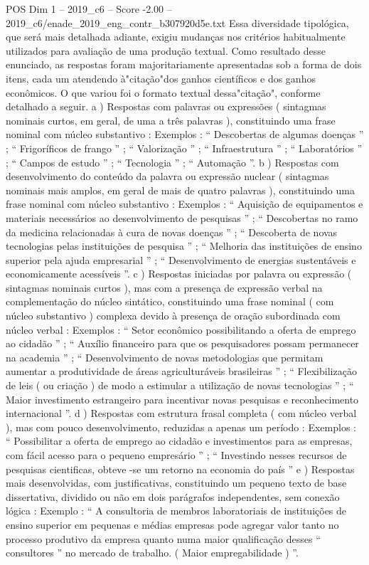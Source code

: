 \begin{textsample}{POS Dim 1 – 2019\_c6 – Score -2.00 – 2019\_c6/enade\_2019\_eng\_contr\_b307920d5e.txt}
Essa diversidade tipológica, que será mais detalhada adiante, exigiu mudanças nos critérios habitualmente utilizados para avaliação de uma produção textual.
Como resultado desse enunciado, as respostas foram majoritariamente apresentadas sob a forma de dois itens, cada um atendendo à"citação"dos ganhos científicos e dos ganhos econômicos.
O que variou foi o formato textual dessa"citação", conforme detalhado a seguir. a ) Respostas com palavras ou expressões ( sintagmas nominais curtos, em geral, de uma a três palavras ), constituindo uma frase nominal com núcleo substantivo : Exemplos : “ Descobertas de algumas doenças ” ; “ Frigoríficos de frango ” ; “ Valorização ” ; “ Infraestrutura ” ; “ Laboratórios ” ; “ Campos de estudo ” ; “ Tecnologia ” ; “ Automação ”. b ) Respostas com desenvolvimento do conteúdo da palavra ou expressão nuclear ( sintagmas nominais mais amplos, em geral de mais de quatro palavras ), constituindo uma frase nominal com núcleo substantivo : Exemplos : “ Aquisição de equipamentos e materiais necessários ao desenvolvimento de pesquisas ” ; “ Descobertas no ramo da medicina relacionadas à cura de novas doenças ” ; “ Descoberta de novas tecnologias pelas instituições de pesquisa ” ; “ Melhoria das instituições de ensino superior pela ajuda empresarial ” ; “ Desenvolvimento de energias sustentáveis e economicamente acessíveis ”. c ) Respostas iniciadas por palavra ou expressão ( sintagmas nominais curtos ), mas com a presença de expressão verbal na complementação do núcleo sintático, constituindo uma frase nominal ( com núcleo substantivo ) complexa devido à presença de oração subordinada com núcleo verbal : Exemplos : “ Setor econômico possibilitando a oferta de emprego ao cidadão ” ; “ Auxílio financeiro para que os pesquisadores possam permanecer na academia ” ; “ Desenvolvimento de novas metodologias que permitam aumentar a produtividade de áreas agriculturáveis brasileiras ” ; “ Flexibilização de leis ( ou criação ) de modo a estimular a utilização de novas tecnologias ” ; “ Maior investimento estrangeiro para incentivar novas pesquisas e reconhecimento internacional ”. d ) Respostas com estrutura frasal completa ( com núcleo verbal ), mas com pouco desenvolvimento, reduzidas a apenas um período : Exemplos : “ Possibilitar a oferta de emprego ao cidadão e investimentos para as empresas, com fácil acesso para o pequeno empresário ” ; “ Investindo nesses recursos de pesquisas cientificas, obteve -se um retorno na economia do país ” e ) Respostas mais desenvolvidas, com justificativas, constituindo um pequeno texto de base dissertativa, dividido ou não em dois parágrafos independentes, sem conexão lógica : Exemplo : “ A consultoria de membros laboratoriais de instituições de ensino superior em pequenas e médias empresas pode agregar valor tanto no processo produtivo da empresa quanto numa maior qualificação desses “ consultores ” no mercado de trabalho. ( Maior empregabilidade ) ”.

\end{textsample}
